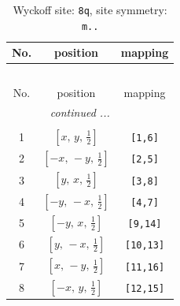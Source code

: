 \documentclass[fleqn,8pt]{jsarticle}
\begin{document}
\begin{longtable}{ccc}
\caption{Wyckoff site: {\tt 8q}, site symmetry: {\tt m..}}
 \\
 \hline \hline
No. & position & mapping \\ \hline \endfirsthead

\multicolumn{2}{l}{\tablename\ \thetable{}} \\
 \hline \hline
No. & position & mapping \\ \hline \endhead

 \hline \hline
\multicolumn{2}{r}{\footnotesize\it continued ...} \\ \endfoot

 \hline \hline
\multicolumn{2}{r}{} \\ \endlastfoot

1 & $\left[ x,\, y,\, \frac{1}{2} \right]$ & {\tt [1,6]} \\ \hline
2 & $\left[ - x,\, - y,\, \frac{1}{2} \right]$ & {\tt [2,5]} \\ \hline
3 & $\left[ y,\, x,\, \frac{1}{2} \right]$ & {\tt [3,8]} \\ \hline
4 & $\left[ - y,\, - x,\, \frac{1}{2} \right]$ & {\tt [4,7]} \\ \hline
5 & $\left[ - y,\, x,\, \frac{1}{2} \right]$ & {\tt [9,14]} \\ \hline
6 & $\left[ y,\, - x,\, \frac{1}{2} \right]$ & {\tt [10,13]} \\ \hline
7 & $\left[ x,\, - y,\, \frac{1}{2} \right]$ & {\tt [11,16]} \\ \hline
8 & $\left[ - x,\, y,\, \frac{1}{2} \right]$ & {\tt [12,15]} \\
\end{longtable}
\renewcommand{\arraystretch}{1.2}
\end{document}
